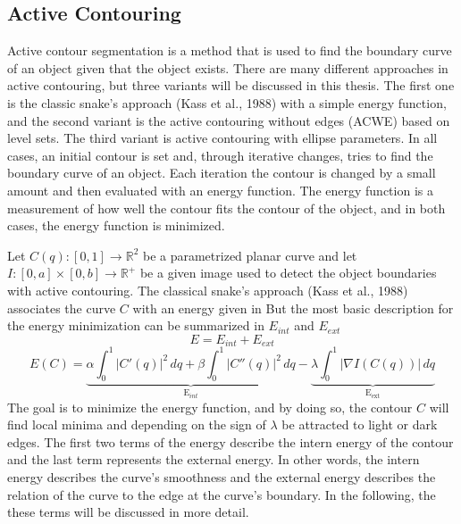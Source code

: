 \subsection{Active Contouring }
Active contour \cite{vondracek_image_2018} segmentation is a method that is used to find the boundary curve of an object given that the object exists. There are many different approaches in active contouring, but three variants will be discussed in this thesis. The first one is the classic snake's approach (Kass et al., 1988) \cite{kass_snakes_1988} with a simple energy function, and the second variant is the active contouring without edges (ACWE)  based on level sets. The third variant is active contouring with ellipse parameters. In all cases, an initial contour is set and, through iterative changes, tries to find the boundary curve of an object. Each iteration the contour is changed by a small amount and then evaluated with an energy function. The energy function is a measurement of how well the contour fits the contour of the object, and in both cases, the energy function is minimized.

Let $C(q): [0, 1] \rightarrow \mathbb{R}^2$ be a parametrized planar curve and let $I : [0, a] \times [0, b] \rightarrow \mathbb{R}^+$ be a given image used to detect the object boundaries with active contouring. The classical snake's approach (Kass et al., 1988) \cite{kass_snakes_1988} associates the curve $C$ with an energy given in 
But the most basic description for the energy minimization can be summarized in $E_{int}$ and $E_{ext}$ 
\begin{equation}
    E = E_{int} + E_{ext}
    \label{energy}
\end{equation}
\begin{equation}
        E(C) = \underbrace{\alpha \int_0^1 |C'(q)|^2 \, dq + \beta \int_0^1 |C''(q)|^2 \, dq}_{\text{E}_{int}} - \underbrace{\lambda \int_0^1 |\nabla I (C(q))| \, dq}_{\text{E}_{\text{ext}}}
\label{acgd}
\end{equation}
The goal is to minimize the energy function, and by doing so, the contour $C$ will find local minima and depending on the sign of $\lambda$ be attracted to light or dark edges. The first two terms of the energy describe the intern energy of the contour and the last term represents the external energy. In other words, the intern energy describes the curve's smoothness and the external energy describes the relation of the curve to the edge at the curve's boundary. In the following, the these terms will be discussed in more detail.

